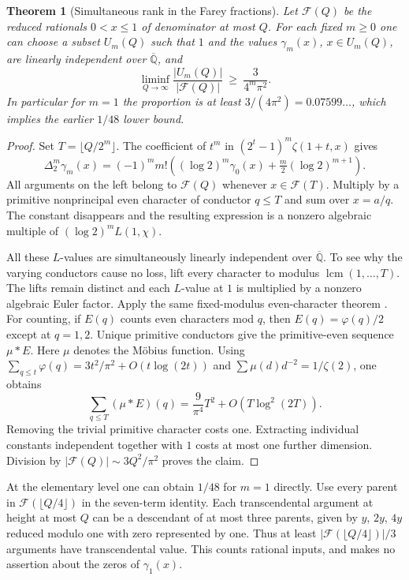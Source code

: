 \documentclass[11pt,a4paper]{article}
\newtheorem{theorem}{Theorem}[section]
\theoremstyle{definition}\newtheorem{definition}[theorem]{Definition}\newtheorem{example}[theorem]{Example}
\theoremstyle{remark}\newtheorem{remark}[theorem]{Remark}
\newcommand{\Q}{\mathbb Q}\newcommand{\Z}{\mathbb Z}\newcommand{\R}{\mathbb R}\newcommand{\N}{\mathbb N}
\begin{document}
\begin{theorem}[Simultaneous rank in the Farey fractions]\label{thm:farey}
Let $\mathcal F(Q)$ be the reduced rationals $0<x\le1$ of denominator at most $Q$. For each fixed $m\ge0$ one can choose a subset $U_m(Q)$ such that $1$ and the values $\gamma_m(x)$, $x\in U_m(Q)$, are linearly independent over $\overline{\Q}$, and
\[
\liminf_{Q\to\infty}\frac{|U_m(Q)|}{|\mathcal F(Q)|}\ \ge\ \frac{3}{4^m\pi^2}.
\]
In particular for $m=1$ the proportion is at least $3/(4\pi^2)=0.07599\ldots$, which implies the earlier $1/48$ lower bound.
\end{theorem}
\begin{proof}
Set $T=\lfloor Q/2^m\rfloor$. The coefficient of $t^m$ in $(2^t-1)^m\zeta(1+t,x)$ gives
\[
\Delta_2^m\gamma_m(x)=(-1)^m m!\left((\log2)^m\gamma_0(x)+\tfrac m2(\log2)^{m+1}\right).
\]
All arguments on the left belong to $\mathcal F(Q)$ whenever $x\in\mathcal F(T)$. Multiply by a primitive nonprincipal even character of conductor $q\le T$ and sum over $x=a/q$. The constant disappears and the resulting expression is a nonzero algebraic multiple of $(\log2)^m L(1,\chi)$.

All these $L$-values are simultaneously linearly independent over $\overline{\Q}$. To see why the varying conductors cause no loss, lift every character to modulus $\operatorname{lcm}(1,\ldots,T)$. The lifts remain distinct and each $L$-value at $1$ is multiplied by a nonzero algebraic Euler factor. Apply the same fixed-modulus even-character theorem \cite{MurtySaradha}. For counting, if $E(q)$ counts even characters mod $q$, then $E(q)=\varphi(q)/2$ except at $q=1,2$. Unique primitive conductors give the primitive-even sequence $\mu*E$. Here $\mu$ denotes the M\"obius function. Using $\sum_{q\le t}\varphi(q)=3t^2/\pi^2+O(t\log(2t))$ and $\sum\mu(d)d^{-2}=1/\zeta(2)$, one obtains
\[
\sum_{q\le T}(\mu*E)(q)=\frac{9}{\pi^4}T^2+O(T\log^2(2T)).
\]
Removing the trivial primitive character costs one. Extracting individual constants independent together with $1$ costs at most one further dimension. Division by $|\mathcal F(Q)|\sim3Q^2/\pi^2$ proves the claim.
\end{proof}
At the elementary level one can obtain $1/48$ for $m=1$ directly. Use every parent in $\mathcal F(\lfloor Q/4\rfloor)$ in the seven-term identity. Each transcendental argument at height at most $Q$ can be a descendant of at most three parents, given by $y$, $2y$, $4y$ reduced modulo one with zero represented by one. Thus at least $|\mathcal F(\lfloor Q/4\rfloor)|/3$ arguments have transcendental value. This counts rational inputs, and makes no assertion about the zeros of $\gamma_1(x)$.
\end{document}

